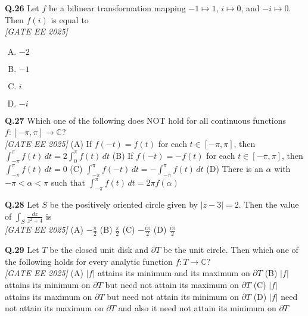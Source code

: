 \documentclass[11pt]{article}
\begin{document}
\vspace{0.5cm}

\noindent\textbf{Q.26}  
Let \(f\) be a bilinear transformation mapping \(-1\mapsto1\), \(i\mapsto 0\), and \(-i\mapsto 0\). Then \(f(i)\) is equal to  
\\[1ex] \textit{[GATE EE 2025]}

\begin{enumerate}[(A)]
\item \(-2\) \item \(-1\) \item \(i\) \item \(-i\)
\end{enumerate}

\begin{flushleft}
\textbf{Q.27} Which one of the following does NOT hold for all continuous functions $f:[-\pi,\pi] \rightarrow \mathbb{C}$?
\\[1ex] \textit{[GATE EE 2025]}
\newline
(A) If $f(-t) = f(t)$ for each $t \in [-\pi, \pi]$, then $\int_{-\pi}^{\pi} f(t)\,dt = 2\int_{0}^{\pi} f(t)\,dt$ \newline
(B) If $f(-t) = -f(t)$ for each $t \in [-\pi, \pi]$, then $\int_{-\pi}^{\pi} f(t)\,dt = 0$ \newline
(C) $\int_{-\pi}^{\pi} f(-t)\,dt = -\int_{-\pi}^{\pi} f(t)\,dt$ \newline
(D) There is an $\alpha$ with $-\pi < \alpha < \pi$ such that $\int_{-\pi}^{\pi} f(t)\,dt = 2\pi f(\alpha)$ \newline

\vspace{5pt}
\textbf{Q.28} Let $S$ be the positively oriented circle given by $|z - 3| = 2$. Then the value of $\int_{S} \frac{dz}{z^2 + 4}$ is
\\[1ex] \textit{[GATE EE 2025]}
\newline
(A) $-\frac{\pi}{2}$ \hspace{12pt}
(B) $\frac{\pi}{2}$ \hspace{12pt}
(C) $-\frac{i\pi}{2}$ \hspace{12pt}
(D) $\frac{i\pi}{2}$ \newline

\vspace{5pt}
\textbf{Q.29} Let $T$ be the closed unit disk and $\partial T$ be the unit circle. Then which one of the following holds for every analytic function $f : T \rightarrow \mathbb{C}$?
\\[1ex] \textit{[GATE EE 2025]}
\newline
(A) $|f|$ attains its minimum and its maximum on $\partial T$ \newline
(B) $|f|$ attains its minimum on $\partial T$ but need not attain its maximum on $\partial T$ \newline
(C) $|f|$ attains its maximum on $\partial T$ but need not attain its minimum on $\partial T$ \newline
(D) $|f|$ need not attain its maximum on $\partial T$ and also it need not attain its minimum on $\partial T$ \newline


\end{flushleft}
\end{document}

